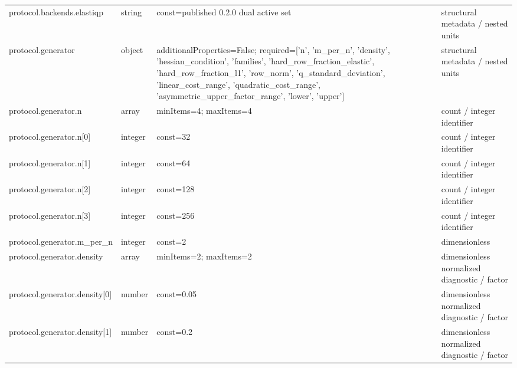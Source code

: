 \begin{longtable}{@{}>{\raggedright\arraybackslash}p{}>{\raggedright\arraybackslash}p{}>{\raggedright\arraybackslash}p{}>{\raggedright\arraybackslash}p{}@{}}
protocol.\allowbreak{}backends.\allowbreak{}elastiqp & string & const=\allowbreak{}published 0.\allowbreak{}2.\allowbreak{}0 dual active set & structural metadata /\allowbreak{} nested units\\
protocol.\allowbreak{}generator & object & additionalProperties=\allowbreak{}False; required=\allowbreak{}['n', 'm\_\allowbreak{}per\_\allowbreak{}n', 'density', 'hessian\_\allowbreak{}condition', 'families', 'hard\_\allowbreak{}row\_\allowbreak{}fraction\_\allowbreak{}elastic', 'hard\_\allowbreak{}row\_\allowbreak{}fraction\_\allowbreak{}l1', 'row\_\allowbreak{}norm', 'q\_\allowbreak{}standard\_\allowbreak{}deviation', 'linear\_\allowbreak{}cost\_\allowbreak{}range', 'quadratic\_\allowbreak{}cost\_\allowbreak{}range', 'asymmetric\_\allowbreak{}upper\_\allowbreak{}factor\_\allowbreak{}range', 'lower', 'upper'] & structural metadata /\allowbreak{} nested units\\
protocol.\allowbreak{}generator.\allowbreak{}n & array & minItems=\allowbreak{}4; maxItems=\allowbreak{}4 & count /\allowbreak{} integer identifier\\
protocol.\allowbreak{}generator.\allowbreak{}n[0] & integer & const=\allowbreak{}32 & count /\allowbreak{} integer identifier\\
protocol.\allowbreak{}generator.\allowbreak{}n[1] & integer & const=\allowbreak{}64 & count /\allowbreak{} integer identifier\\
protocol.\allowbreak{}generator.\allowbreak{}n[2] & integer & const=\allowbreak{}128 & count /\allowbreak{} integer identifier\\
protocol.\allowbreak{}generator.\allowbreak{}n[3] & integer & const=\allowbreak{}256 & count /\allowbreak{} integer identifier\\
protocol.\allowbreak{}generator.\allowbreak{}m\_\allowbreak{}per\_\allowbreak{}n & integer & const=\allowbreak{}2 & dimensionless\\
protocol.\allowbreak{}generator.\allowbreak{}density & array & minItems=\allowbreak{}2; maxItems=\allowbreak{}2 & dimensionless normalized diagnostic /\allowbreak{} factor\\
protocol.\allowbreak{}generator.\allowbreak{}density[0] & number & const=\allowbreak{}0.\allowbreak{}05 & dimensionless normalized diagnostic /\allowbreak{} factor\\
protocol.\allowbreak{}generator.\allowbreak{}density[1] & number & const=\allowbreak{}0.\allowbreak{}2 & dimensionless normalized diagnostic /\allowbreak{} factor\\

\end{longtable}
